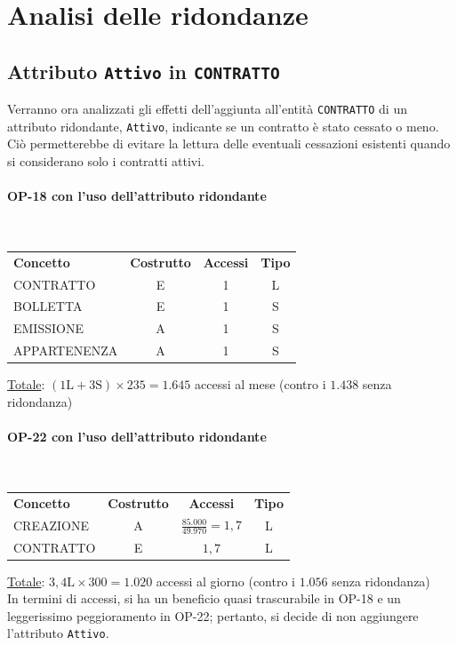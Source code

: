 \documentclass[a4paper,12pt]{report}
\begin{document}
\section{Analisi delle ridondanze}
\subsection{Attributo \texttt{Attivo} in \texttt{CONTRATTO}}
Verranno ora analizzati gli effetti dell'aggiunta all'entità \texttt{CONTRATTO} di un attributo ridondante, \texttt{Attivo}, indicante se un contratto è stato cessato o meno. Ciò permetterebbe di evitare la lettura delle eventuali cessazioni esistenti quando si considerano solo i contratti attivi.
\paragraph{OP-18 con l'uso dell'attributo ridondante}\mbox{}\\
\begin{center}
\begin{tabular}{@{}l c  c  c@{}}
    \hline
    \textbf{Concetto} & \textbf{Costrutto} & \textbf{Accessi} & \textbf{Tipo} \\ [0.5ex]
    CONTRATTO & E & 1 & L \\
    BOLLETTA & E & 1 & S \\
    EMISSIONE & A & 1 & S \\
    APPARTENENZA & A & 1 & S \\
    \hline
\end{tabular}
\end{center}
\underline{Totale}: $(1\text{L} + 3\text{S}) \times 235 = 1.645$ accessi al mese (contro i $1.438$ senza ridondanza)
\paragraph{OP-22 con l'uso dell'attributo ridondante}\mbox{}\\
\begin{center}
\begin{tabular}{@{}l c  c  c@{}}
    \hline
    \textbf{Concetto} & \textbf{Costrutto} & \textbf{Accessi} & \textbf{Tipo} \\ [0.5ex]
    CREAZIONE & A & $\frac{85.000}{49.970} = 1,7$ & L \\
    CONTRATTO & E & $1,7$ & L \\
    \hline
\end{tabular}
\end{center}
\underline{Totale}: $3,4\text{L} \times 300 = 1.020$ accessi al giorno (contro i $1.056$ senza ridondanza)
\\[10pt]
In termini di accessi, si ha un beneficio quasi trascurabile in OP-18 e un leggerissimo peggioramento in OP-22; pertanto, si decide di non aggiungere l'attributo \texttt{Attivo}.
\end{document}
